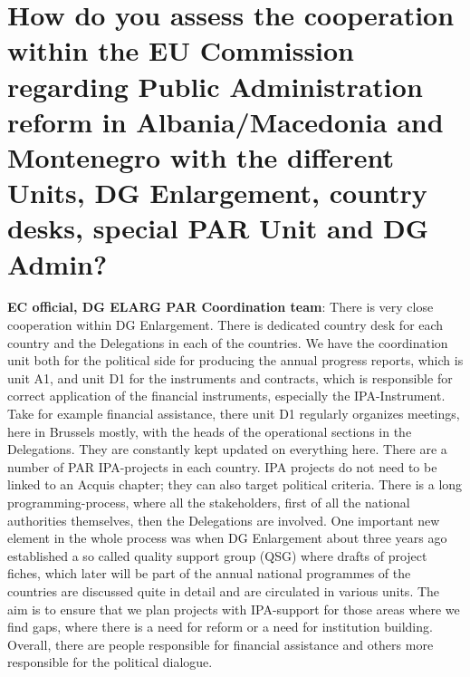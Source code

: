 \section{How do you assess the cooperation within the EU Commission regarding Public Administration reform in Albania/Macedonia and Montenegro with the different Units, DG Enlargement, country desks, special PAR Unit and DG Admin? }
\label{sec:admin}
\textbf{EC official, DG ELARG PAR Coordination team}: There is very close cooperation within DG Enlargement. There is dedicated country desk for each country and the Delegations in each of the countries. We have the coordination unit both for the political side for producing the annual progress reports, which is unit A1, and unit D1 for the instruments and contracts, which is responsible for correct application of the financial instruments, especially the IPA-Instrument. Take for example financial assistance, there unit D1 regularly organizes meetings, here in Brussels mostly, with the heads of the operational sections in the Delegations. They are constantly kept updated on everything here. There are a number of PAR IPA-projects in each country. IPA projects do not need to be linked to an Acquis chapter; they can also target political criteria. There is a long programming-process, where all the stakeholders, first of all the national authorities themselves, then the Delegations are involved. One important new element in the whole process was when DG Enlargement about three years ago established a so called quality support group (QSG) where drafts of project fiches, which later will be part of the annual national programmes of the countries are discussed quite in detail and are circulated in various units. The aim is to ensure that we plan projects with IPA-support for those areas where we find gaps, where there is a need for reform or a need for institution building. Overall, there are people responsible for financial assistance and others more responsible for the political dialogue. \\
